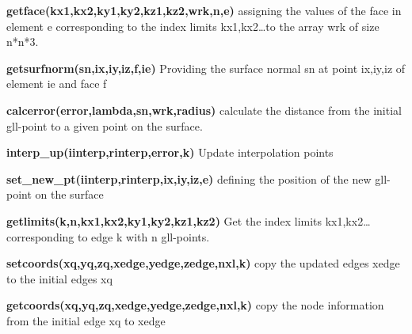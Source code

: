 \textbf{getface(kx1,kx2,ky1,ky2,kz1,kz2,wrk,n,e)} assigning the values of the face in element e corresponding to the index limits kx1,kx2\ldots to the array wrk of size n*n*3.

\textbf{getsurfnorm(sn,ix,iy,iz,f,ie)} Providing the surface normal sn at point ix,iy,iz of element ie and face f 

\textbf{calcerror(error,lambda,sn,wrk,radius)} calculate the distance from the initial gll-point to a given point on the surface.  

\textbf{interp\_up(iinterp,rinterp,error,k)} Update interpolation points

\textbf{set\_new\_pt(iinterp,rinterp,ix,iy,iz,e)} defining the position of the new gll-point on the surface

\textbf{getlimits(k,n,kx1,kx2,ky1,ky2,kz1,kz2)} Get the index limits kx1,kx2\ldots corresponding to edge k with n gll-points.

\textbf{setcoords(xq,yq,zq,xedge,yedge,zedge,nxl,k)} copy the updated edges xedge to the initial edges xq

\textbf{getcoords(xq,yq,zq,xedge,yedge,zedge,nxl,k)} copy the node information from the initial edge xq to xedge
